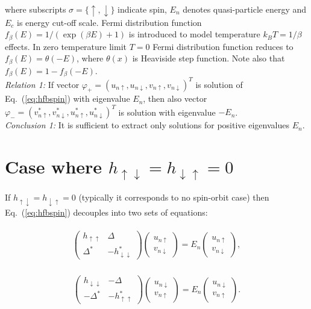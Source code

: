 \documentclass[a4paper,10pt]{article}
\begin{document}
where subscripts $\sigma=\{\uparrow,\downarrow\}$ indicate spin, $E_{n}$ denotes quasi-particle energy and $E_c$ is energy cut-off scale. Fermi distribution function $f_{\beta}(E)=1/(\exp(\beta E)+1)$ is introduced to model temperature $k_B T=1/\beta$ effects. In zero temperature limit $T=0$ Fermi distribution function reduces to  $f_{\beta}(E)=\theta(-E)$, where $\theta(x)$ is Heaviside step function. Note also that $f_{\beta}(E)=1-f_{\beta}(-E)$.\\

\noindent\textit{Relation 1:} If vector $\varphi_{+}=\left( u_{n\uparrow},u_{n\downarrow},v_{n\uparrow},v_{n\downarrow}\right) ^{T}$ is solution of Eq.~(\ref{eq:hfbspin}) with eigenvalue $E_n$, then also vector $\varphi_{-}=(v_{n\uparrow}^*,v_{n\downarrow}^*,u_{n\uparrow}^*,u_{n\downarrow}^*)^{T}$ is solution with eigenvalue $-E_n$.\\

\noindent\textit{Conclusion 1:} It is sufficient to extract only solutions for positive eigenvalues $E_n$. 

\section{Case where $h_{\uparrow \downarrow}=h_{\downarrow \uparrow}=0$}
If $h_{\uparrow \downarrow}=h_{\downarrow \uparrow}=0$ (typically it corresponds to no spin-orbit case) then Eq.~(\ref{eq:hfbspin}) decouples into two sets of equations:

\begin{align}\label{eq:hfbspin1}
\begin{gathered}
\begin{pmatrix}
h_{\uparrow \uparrow}  &  \Delta \\
\Delta^* &  -h^*_{\downarrow \downarrow}
\end{pmatrix} 
\begin{pmatrix}
u_{n\uparrow} \\
v_{n\downarrow}
\end{pmatrix}
= E_n
\begin{pmatrix}
u_{n\uparrow} \\
v_{n\downarrow}
\end{pmatrix} ,
\end{gathered}
\end{align}

\begin{align}\label{eq:hfbspin2}
\begin{gathered}
\begin{pmatrix}
h_{\downarrow \downarrow}& -\Delta \\
-\Delta^* &  -h^*_{\uparrow \uparrow}
\end{pmatrix} 
\begin{pmatrix}
u_{n\downarrow} \\
v_{n\uparrow}
\end{pmatrix}
= E_n
\begin{pmatrix}
u_{n\downarrow} \\
v_{n\uparrow}
\end{pmatrix} .
\end{gathered}
\end{align}
\end{document}
